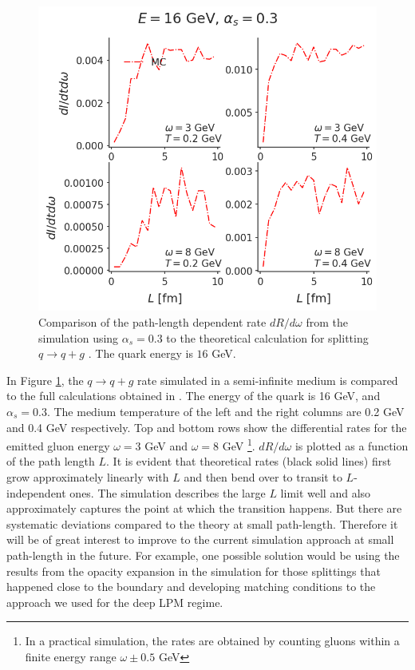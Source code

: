 \documentclass[aps, prc, reprint, amsmath, groupedaddress, nofootinbib]{revtex4-1}
\begin{document}
\begin{figure}
\includegraphics[width=\columnwidth]{spectrum_L.png}
\caption{Comparison of the path-length dependent rate $dR/d\omega$ from the simulation using $\alpha_s = 0.3$ to the theoretical calculation for splitting $q\rightarrow q+g$ \cite{CaronHuot:2010bp}. The quark energy is $16$ GeV.}
\label{fig:spectra-L-alphas=0.3}
\end{figure}

In Figure \ref{fig:spectra-L-alphas=0.3}, the $q\rightarrow q+g$ rate simulated in a semi-infinite medium is compared to the full calculations obtained in \cite{CaronHuot:2010bp}.
The energy of the quark is 16 GeV, and $\alpha_s = 0.3$.
The medium temperature of the left and the right columns are 0.2 GeV and 0.4 GeV respectively.
Top and bottom rows show the differential rates for the emitted gluon energy $\omega = 3$ GeV and $\omega = 8$ GeV \footnote{In a practical simulation, the rates are obtained by counting gluons within a finite energy range $\omega\pm 0.5$ GeV}.
$dR/d\omega$ is plotted as a function of the path length $L$.
It is evident that theoretical rates (black solid lines) first grow approximately linearly with $L$ and then bend over to transit to $L$-independent ones.
The simulation describes the large $L$ limit well and also approximately captures the point at which the transition happens.
But there are systematic deviations compared to the theory at small path-length.
Therefore it will be of great interest to improve to the current simulation approach at small path-length in the future. 
For example, one possible solution would be using the results from the opacity expansion in the simulation for those splittings that happened close to the boundary and developing matching conditions to the approach we used for the deep LPM regime.
\end{document}
